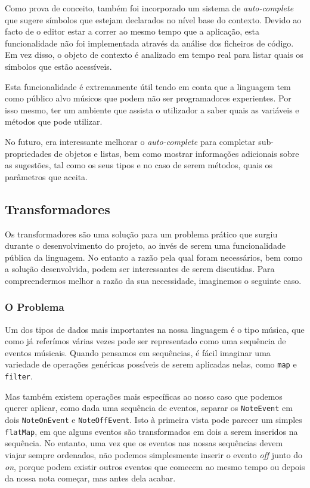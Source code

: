 Como prova de conceito, também foi incorporado um sistema de \textit{auto-complete} que sugere símbolos que estejam declarados no nível base do contexto. Devido ao facto de o editor estar a correr ao mesmo tempo que a aplicação, esta funcionalidade não foi implementada através da análise dos ficheiros de código. Em vez disso, o objeto de contexto é analizado em tempo real para listar quais os símbolos que estão acessíveis.

Esta funcionalidade é extremamente útil tendo em conta que a linguagem tem como público alvo músicos que podem não ser programadores experientes. Por isso mesmo, ter um ambiente que assista o utilizador a saber quais as variáveis e métodos que pode utilizar.

No futuro, era interessante melhorar o \textit{auto-complete} para completar sub-propriedades de objetos e listas, bem como mostrar informações adicionais sobre as sugestões, tal como os seus tipos e no caso de serem métodos, quais os parâmetros que aceita.

\subsection{Transformadores}
Os transformadores são uma solução para um problema prático que surgiu durante o desenvolvimento do projeto, ao invés de serem uma funcionalidade pública da linguagem. No entanto a razão pela qual foram necessários, bem como a solução desenvolvida, podem ser interessantes de serem discutidas. Para compreendermos melhor a razão da sua necessidade, imaginemos o seguinte caso.

\subsubsection{O Problema}

Um dos tipos de dados mais importantes na nossa linguagem é o tipo música, que como já referímos várias vezes pode ser representado como uma sequência de eventos músicais. Quando pensamos em sequências, é fácil imaginar uma variedade de operações genéricas possíveis de serem aplicadas nelas, como \texttt{map} e \texttt{filter}. 

Mas também existem operações mais específicas ao nosso caso que podemos querer aplicar, como dada uma sequência de eventos, separar os \texttt{NoteEvent} em dois \texttt{NoteOnEvent} e \texttt{NoteOffEvent}. Isto à primeira vista pode parecer um simples \texttt{flatMap}, em que alguns eventos são transformados em dois a serem inseridos na sequência. No entanto, uma vez que os eventos nas nossas sequências devem viajar sempre ordenados, não podemos simplesmente inserir o evento \textit{off} junto do \textit{on}, porque podem existir outros eventos que comecem ao mesmo tempo ou depois da nossa nota começar, mas antes dela acabar.

